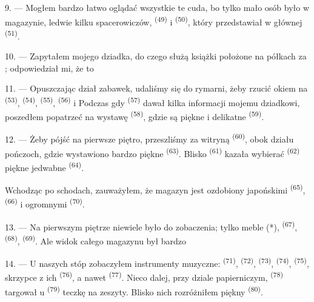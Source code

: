 
9. --- Mogłem bardzo łatwo oglądać wszystkie te cuda, bo tylko mało osób było w
magazynie, ledwie kilku spacerowiczów,  \textsuperscript{(49)} i
 \textsuperscript{(50)}, który przedstawiał  w głównej
 \textsuperscript{(51)}.

10. --- Zapytałem mojego dziadka, do czego służą książki położone na półkach za
; odpowiedział mi, że to 

\VUsaut{3.6mm}
\VUsaut{2.8mm}

11. --- Opuszczając dział zabawek, udaliśmy się do rymarni, żeby rzucić okiem na
 \textsuperscript{(53)},  \textsuperscript{(54)},
 \textsuperscript{(55)},  \textsuperscript{(56)} i
 Podczas gdy  \textsuperscript{(57)} dawał
kilka informacji mojemu dziadkowi, poszedłem popatrzeć na wystawę  \textsuperscript{(58)}, gdzie są piękne  i delikatne
 \textsuperscript{(59)}.

12. --- Żeby pójść na pierwsze piętro, przeszliśmy za witryną 
\textsuperscript{(60)}, obok działu pończoch, gdzie wystawiono bardzo piękne
 \textsuperscript{(63)}. Blisko 
\textsuperscript{(61)} kazała wybierać  \textsuperscript{(62)} piękne
jedwabne  \textsuperscript{(64)}.

Wchodząc po schodach, zauważyłem, że magazyn jest ozdobiony japońskimi
 \textsuperscript{(65)},  \textsuperscript{(66)} i
ogromnymi  \textsuperscript{(70)}.

13. --- Na pierwszym piętrze niewiele było do zobaczenia; tylko meble (*),  \textsuperscript{(67)},  \textsuperscript{(68)},
 \textsuperscript{(69)}. Ale widok całego magazynu był bardzo

14. --- U naszych stóp zobaczyłem instrumenty muzyczne: 
\textsuperscript{(71)},  \textsuperscript{(72)}, 
\textsuperscript{(73)},  \textsuperscript{(74)},
 \textsuperscript{(75)}, skrzypce z ich 
\textsuperscript{(76)}, a nawet  \textsuperscript{(77)}. Nieco
dalej, przy dziale papierniczym,  \textsuperscript{(78)} targował u
 \textsuperscript{(79)} teczkę na zeszyty. Blisko nich rozróżniłem
piękny  \textsuperscript{(80)}.

